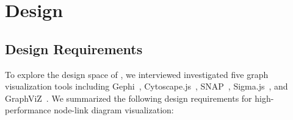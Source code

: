 \section{Design}

\subsection {Design Requirements}


    To explore the design space of \name, we interviewed  investigated five graph visualization tools including Gephi~\cite{DBLP:conf/icwsm/BastianHJ09}, Cytoscape.js~\cite{DBLP:journals/bioinformatics/FranzLHDSB16}, SNAP~\cite{leskovec2016snap}, Sigma.js~\cite{DBLP:journals/jossw/Coene18}, and GraphViZ~\cite{Ellson03graphvizand}. We summarized the following design requirements for high-performance node-link diagram visualization:


